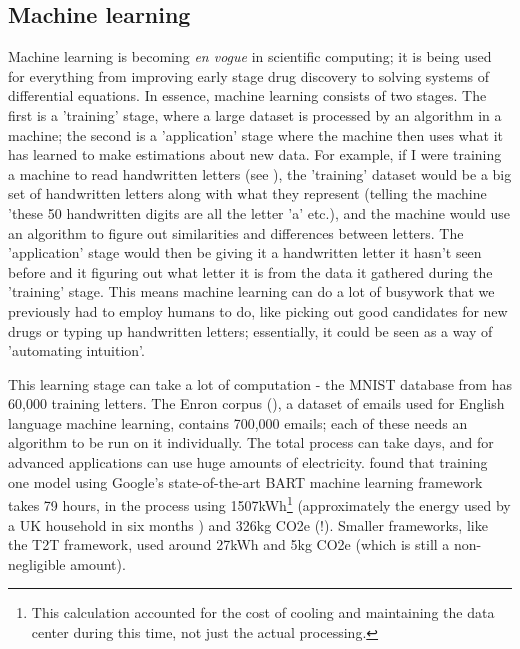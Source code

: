 \documentclass{article}
\begin{document}
\subsection{Machine learning}
Machine learning is becoming \textit{en vogue} in scientific computing; it is being used for everything from improving early stage drug discovery \citep{imrie2021generating} to solving systems of differential equations. \citep{bhattacharya2020model} In essence, machine learning consists of two stages. The first is a 'training' stage, where a large dataset is processed by an algorithm in a machine; the second is a 'application' stage where the machine then uses what it has learned to make estimations about new data. For example, if I were training a machine to read handwritten letters (see \citet{deng2012mnist}), the 'training' dataset would be a big set of handwritten letters along with what they represent (telling the machine 'these 50 handwritten digits are all the letter 'a' etc.), and the machine would use an algorithm to figure out similarities and differences between letters. The 'application' stage would then be giving it a handwritten letter it hasn't seen before and it figuring out what letter it is from the data it gathered during the 'training' stage. This means machine learning can do a lot of busywork that we previously had to employ humans to do, like picking out good candidates for new drugs or typing up handwritten letters; essentially, it could be seen as a way of 'automating intuition'. \newline

This learning stage can take a lot of computation - the MNIST database from \citet{deng2012mnist} has 60,000 training letters. The Enron corpus (\citet[see][]{klimt2004enron}), a dataset of emails used for English language machine learning, contains 700,000 emails; each of these needs an algorithm to be run on it individually. The total process can take days, and for advanced applications can use  huge amounts of electricity. \citet{strubell2019energy} found that training one model using Google's state-of-the-art BART machine learning framework takes 79 hours, in the process using 1507kWh\footnote{This calculation accounted for the cost of cooling and maintaining the data center during this time, not just the actual processing.} (approximately the energy used by a UK household in six months \citep{waters2019energy}) and 326kg CO2e (!). Smaller frameworks, like the T2T framework, used around 27kWh and 5kg CO2e (which is still a non-negligible amount). \newline
\end{document}
